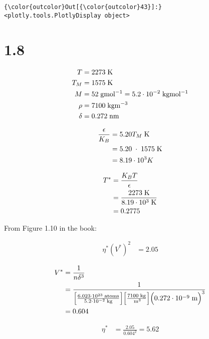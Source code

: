 \documentclass[11pt]{article}
\begin{document}
            \begin{Verbatim}[commandchars=\\\{\}]
{\color{outcolor}Out[{\color{outcolor}43}]:} <plotly.tools.PlotlyDisplay object>
\end{Verbatim}
        
    \section{1.8}\label{section}

    \begin{align}
    T &= 2273 \; \mathrm{K} \nonumber \\
    T_M &= 1575 \; \mathrm{K} \nonumber \\
    M &= 52 \; \mathrm{gmol^{-1}} = 5.2 \cdot 10^{-2} \; \mathrm{kgmol^{-1} }\nonumber \\
    \rho &= 7100 \; \mathrm{kgm^{-3}} \nonumber \\
    \delta &= 0.272 \; \mathrm{nm} \nonumber
\end{align}

    \begin{align}
\frac{\epsilon}{K_B} &= 5.20T_M \; \mathrm{K} \\
&= 5.20 \; \cdot \; 1575 \; \mathrm{K} \nonumber \\
&= 8.19 \cdot 10^{3} K \nonumber
\end{align}

    \begin{align}
T^{*} &= \frac{K_BT}{\epsilon} \\
&= \frac{2273 \; \mathrm{K}}{8.19 \cdot 10^{3} \; \mathrm{K}} \nonumber \\
&= 0.2775 \nonumber
\end{align}

    From Figure 1.10 in the book:

\begin{align}
\eta^*(V^*)^2 &= 2.05 \nonumber
\end{align}

    \begin{align}
V^* &= \frac{1}{n\delta^3} \\
&= \frac{1}{ \Big[ \frac{ 6.023 \cdot 10^{23} \; \mathrm{atoms} } { 5.2 \cdot 10^{-2} \; \mathrm{kg} } \Big] \Big[ \frac{7100 \; \mathrm{kg}}{\; \mathrm{m^{3}}} \Big] \Big( 0.272 \cdot 10^{-9} \; \mathrm{m} \Big)^3 } \nonumber \\
&= 0.604 \nonumber
\end{align}

    \begin{align}
\eta^* &= \frac{2.05}{0.604^2} =5.62 \nonumber
\end{align}
\end{document}
